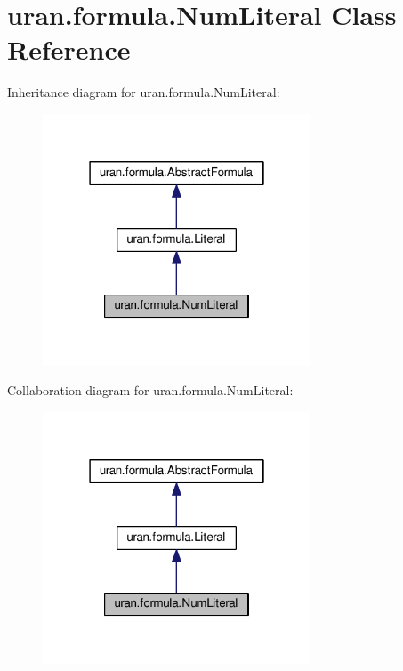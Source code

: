 \hypertarget{classuran_1_1formula_1_1_num_literal}{}\section{uran.\+formula.\+Num\+Literal Class Reference}
\label{classuran_1_1formula_1_1_num_literal}


Inheritance diagram for uran.\+formula.\+Num\+Literal\+:
\nopagebreak
\begin{figure}[H]
\begin{center}
\leavevmode
\includegraphics[width=226pt]{classuran_1_1formula_1_1_num_literal__inherit__graph}
\end{center}
\end{figure}


Collaboration diagram for uran.\+formula.\+Num\+Literal\+:
\nopagebreak
\begin{figure}[H]
\begin{center}
\leavevmode
\includegraphics[width=226pt]{classuran_1_1formula_1_1_num_literal__coll__graph}
\end{center}
\end{figure}
